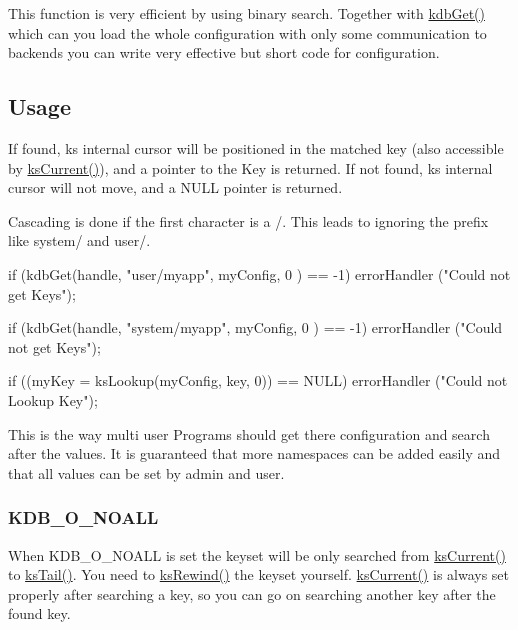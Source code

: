 This function is very efficient by using binary search. Together with \hyperlink{group__kdb_ga28e385fd9cb7ccfe0b2f1ed2f62453a1}{kdbGet()} which can you load the whole configuration with only some communication to backends you can write very effective but short code for configuration.\hypertarget{group__keyset_Usage}{}\subsection{Usage}\label{group__keyset_Usage}
If found, {\ttfamily ks} internal cursor will be positioned in the matched key (also accessible by \hyperlink{group__keyset_ga4287b9416912c5f2ab9c195cb74fb094}{ksCurrent()}), and a pointer to the Key is returned. If not found, {\ttfamily ks} internal cursor will not move, and a NULL pointer is returned.

Cascading is done if the first character is a /. This leads to ignoring the prefix like system/ and user/. 
\begin{DoxyCode}
if (kdbGet(handle, "user/myapp", myConfig, 0 ) == -1)
        errorHandler ("Could not get Keys");

if (kdbGet(handle, "system/myapp", myConfig, 0 ) == -1)
        errorHandler ("Could not get Keys");

if ((myKey = ksLookup(myConfig, key, 0)) == NULL)
        errorHandler ("Could not Lookup Key");
\end{DoxyCode}


This is the way multi user Programs should get there configuration and search after the values. It is guaranteed that more namespaces can be added easily and that all values can be set by admin and user.\hypertarget{group__keyset_KDB_O_NOALL}{}\subsubsection{KDB\_\-O\_\-NOALL}\label{group__keyset_KDB_O_NOALL}
When KDB\_\-O\_\-NOALL is set the keyset will be only searched from \hyperlink{group__keyset_ga4287b9416912c5f2ab9c195cb74fb094}{ksCurrent()} to \hyperlink{group__keyset_gadca442c4ab43cf532b15091d7711559e}{ksTail()}. You need to \hyperlink{group__keyset_gabe793ff51f1728e3429c84a8a9086b70}{ksRewind()} the keyset yourself. \hyperlink{group__keyset_ga4287b9416912c5f2ab9c195cb74fb094}{ksCurrent()} is always set properly after searching a key, so you can go on searching another key after the found key.

